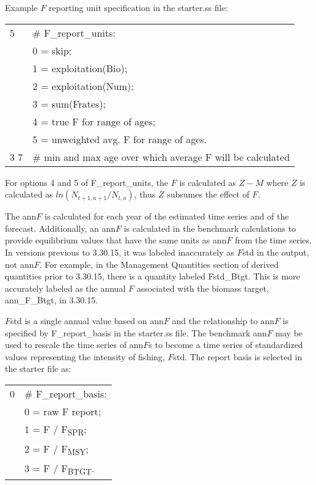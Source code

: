 Example $F$ reporting unit specification in the starter.ss file:

\begin{center}
	\begin{longtable}{p{2cm} p{12cm}}
		\hline
		5 & \# F\_report\_units:\Tstrut\\
		  & 0 = skip; \\
		  & 1 = exploitation(Bio); \\
		  & 2 = exploitation(Num); \\ 
		  & 3 = sum(Frates); \\
		  & 4 = true F for range of ages; \\
		  & 5 = unweighted avg. F for range of ages. \Bstrut\\
		\hline
		3 7 & \# min and max age over which average F will be calculated \Tstrut\Bstrut\\
		\hline
	\end{longtable}
\end{center}

For options 4 and 5 of F\_report\_units, the $F$ is calculated as $Z-M$ where $Z$ is calculated as $ln(N_{t+1,a+1}/N_{t,a})$, thus $Z$ subsumes the effect of $F$.

The ann$F$ is calculated for each year of the estimated time series and of the forecast. Additionally, an ann$F$ is calculated in the benchmark calculations to provide equilibrium values that have the same units as ann$F$ from the time series. In versions previous to 3.30.15, it was labeled inaccurately as $F$std in the output, not ann$F$. For example, in the Management Quantities section of derived quantities prior to 3.30.15, there is a quantity labeled Fstd\_Btgt. This is more accurately labeled as the annual $F$ associated with the biomass target, ann\_F\_Btgt, in 3.30.15.

$F$std is a single annual value based on ann$F$ and the relationship to ann$F$ is specified by F\_report\_basis in the starter.ss file. The benchmark ann$F$ may be used to rescale the time series of ann$F$s to become a time series of standardized values representing the intensity of fishing, $F$std. The report basis is selected in the starter file as:

\begin{center}
	\begin{longtable}{p{2cm} p{12cm}}
		\hline
		0 & \# F\_report\_basis: \Tstrut\\
		& 0 = raw F report; \\
		& 1 = F / F\textsubscript{SPR}; \\ 
		& 2 = F / F\textsubscript{MSY}; \\
		& 3 = F / F\textsubscript{BTGT}.\Bstrut\\
		\hline
	\end{longtable}
\end{center}

